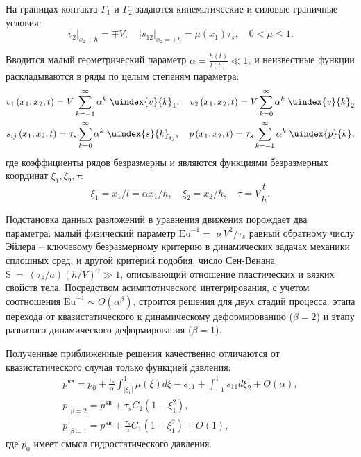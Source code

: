 На границах контакта $\Gamma_1$ и $\Gamma_2$ задаются кинематические и силовые граничные условия:
\begin{equation}
  \label{eq:ch4/sec1/boundary/kinematic}
  v_{2}\lvert_{x_2\pm h} = \mp V, \quad \lvert s_{12}\lvert_{x_2=\pm h} = \mu(x_1) \tau_{s}, \quad 0 < \mu \le 1.
\end{equation}

Вводится малый геометрический параметр $\alpha=\frac{h(t)}{l(t)}\ll 1$, и неизвестные функции раскладываются в ряды по целым степеням параметра:
\begin{gather}
  v_{1}\left(x_1, x_2, t\right) = V \sum_{k=-1}^{\infty}{\alpha^{k} \; \uindex{v}{k}_{1}}, \quad v_{2}\left(x_1, x_2, t\right) = V \sum_{k=0}^{\infty}{\alpha^{k} \; \uindex{v}{k}_{2}}
  \\
  s_{ij}\left(x_1, x_2, t\right) = \tau_{s} \sum_{k=0}^{\infty}{\alpha^{k} \; \uindex{s}{k}_{ij}}, \quad p\left(x_1, x_2, t\right) = \tau_{s} \sum_{k=-1}^{\infty}{\alpha^{k} \; \uindex{p}{k}},
\end{gather}
где коэффициенты рядов безразмерны и являются функциями безразмерных координат $\xi_1, \xi_2, \tau$:
\begin{equation}
  \xi_1 = x_1 / l = \alpha x_1 / h, \quad \xi_2 = x_2 / h, \quad \tau = V \frac{t}{h}.
\end{equation}

Подстановка данных разложений в уравнения движения порождает два параметра: малый физический параметр $\text{Eu}^{-1}=\varrho V^2/\tau_s$ равный обратному числу Эйлера -- ключевому безразмерному критерию в динамических задачах механики сплошных сред, и другой критерий подобия, число Сен-Венана  $\text{S}~=~\left(\tau_s/a\right) \left(h/V\right)^\gamma \gg 1$, описывающий отношение пластических и вязких свойств тела.
Посредством асимптотического интегрирования, с учетом соотношения $\text{Eu}^{-1} \sim O(\alpha^\beta)$, строится решения для двух стадий процесса: этапа перехода от квазистатического к динамическому деформированию ($\beta=2$) и этапу развитого динамического деформирования ($\beta=1$).

Полученные приближенные решения качественно отличаются от квазистатического случая только функцией давления:
\begin{gather}
  p^\text{кв}  = p_0 +  \frac{\tau_{s}}{\alpha}\int_{\vert \xi_1\vert}^1 \mu(\xi) d\xi - s_{11} + \int_{-1}^{1}{s_{11} d\xi_2} + O(\alpha),
  \\
  p\lvert_{\beta=2} = p^\text{кв} + \tau_{s} C_2 \left(1-\xi_1^2\right),
  \\
  p\lvert_{\beta=1} = p^\text{кв} + \frac{\tau_{s}}{\alpha} C_1 \left(1-\xi_1^2\right) + O(1),
\end{gather}
где $p_0$ имеет смысл гидростатического давления.

